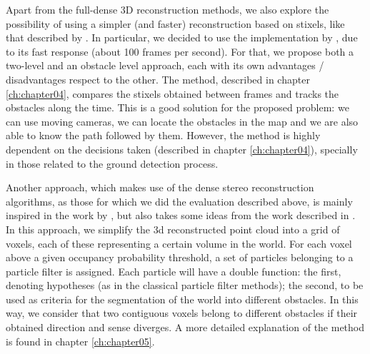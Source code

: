 Apart from the full-dense 3D reconstruction methods, we also explore the possibility of using a simpler (and faster) reconstruction based on stixels, like that described by \cite{badino2009stixel}. In particular, we decided to use the implementation by \cite{benenson2012pedestrian}, due to its fast response (about 100 frames per second). For that, we propose both a two-level and an obstacle level approach, each with its own advantages / disadvantages respect to the other. The method, described in chapter \ref{ch:chapter04}, compares the stixels obtained between frames and tracks the obstacles along the time. This is a good solution for the proposed problem: we can use moving cameras, we can locate the obstacles in the map and we are also able to know the path followed by them. However, the method is highly dependent on the decisions taken (described in chapter \ref{ch:chapter04}), specially in those related to the ground detection process.

Another approach, which makes use of the dense stereo reconstruction algorithms, as those for which we did the evaluation described above, is mainly inspired in the work by \cite{danescu2012particle}, but also takes some ideas from the work described in \cite{broggi2013}. In this approach, we simplify the 3d reconstructed point cloud into a grid of voxels, each of these representing a certain volume in the world. For each voxel above a given occupancy probability threshold, a set of particles belonging to a particle filter is assigned. Each particle will have a double function: the first, denoting hypotheses (as in the classical particle filter methods); the second, to be used as criteria for the segmentation of the world into different obstacles. In this way, we consider that two contiguous voxels belong to different obstacles if their obtained direction and sense diverges. A more detailed explanation of the method is found in chapter \ref{ch:chapter05}.

